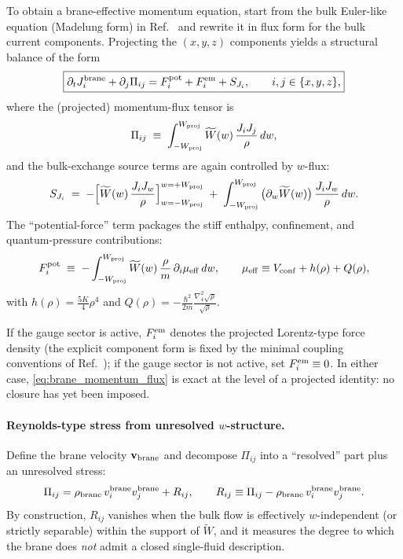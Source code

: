 \documentclass[11pt]{article}
\begin{document}
To obtain a brane-effective momentum equation, start from the bulk Euler-like
equation (Madelung form) in Ref.~\cite{norris2026_4d_model} and rewrite it in flux form for the bulk
current components.  Projecting the $(x,y,z)$ components yields a structural
balance of the form
\begin{align}
\boxed{
\partial_t J^{\rm brane}_i + \partial_j \Pi_{ij} = F^{\rm pot}_i + F^{\rm em}_i + S_{J_i},
\qquad i,j\in\{x,y,z\},
}
\label{eq:brane_momentum_flux}
\end{align}
where the (projected) momentum-flux tensor is
\begin{align}
\Pi_{ij}
\;\equiv\;
\int_{-W_{\rm proj}}^{W_{\rm proj}} \widetilde W(w)\,\frac{J_iJ_j}{\rho}\,dw,
\label{eq:Pi_def}
\end{align}
and the bulk-exchange source terms are again controlled by $w$-flux:
\begin{align}
S_{J_i}
\;=\;
-\Big[\widetilde W(w)\,\frac{J_iJ_w}{\rho}\Big]_{w=-W_{\rm proj}}^{w=+W_{\rm proj}}
\;+\;
\int_{-W_{\rm proj}}^{W_{\rm proj}} \big(\partial_w \widetilde W(w)\big)\,\frac{J_iJ_w}{\rho}\,dw.
\label{eq:brane_momentum_leak}
\end{align}
The ``potential-force'' term packages the stiff enthalpy, confinement, and
quantum-pressure contributions:
\begin{align}
F^{\rm pot}_i
\;\equiv\;
-\int_{-W_{\rm proj}}^{W_{\rm proj}}
\widetilde W(w)\,\frac{\rho}{m}\,\partial_i\mu_{\rm eff}\,dw,
\qquad
\mu_{\rm eff}\equiv V_{\rm conf}+h(\rho)+Q(\rho),
\label{eq:Fpot_def}
\end{align}
with $h(\rho)=\frac{5K}{4}\rho^4$ and $Q(\rho)=-\frac{\hbar^2}{2m}
\frac{\nabla_4^2\sqrt{\rho}}{\sqrt{\rho}}$.

If the gauge sector is active, $F^{\rm em}_i$ denotes the projected Lorentz-type
force density (the explicit component form is fixed by the minimal coupling
conventions of Ref.~\cite{norris2026_4d_model}); if the gauge sector is not active, set
$F^{\rm em}_i\equiv 0$.  In either case, \eqref{eq:brane_momentum_flux} is exact
at the level of a projected identity: no closure has yet been imposed.

\paragraph{Reynolds-type stress from unresolved \texorpdfstring{$w$}{w}-structure.}
Define the brane velocity $\mathbf{v}_{\rm brane}$ and decompose
$\Pi_{ij}$ into a ``resolved'' part plus an unresolved stress:
\begin{align}
\Pi_{ij} = \rho_{\rm brane}\,v^{\rm brane}_i v^{\rm brane}_j + R_{ij},
\qquad
R_{ij}\equiv \Pi_{ij}-\rho_{\rm brane}\,v^{\rm brane}_i v^{\rm brane}_j.
\label{eq:Rij_def}
\end{align}
By construction, $R_{ij}$ vanishes when the bulk flow is effectively
$w$-independent (or strictly separable) within the support of $\widetilde W$,
and it measures the degree to which the brane does \emph{not} admit a closed
single-fluid description.
\end{document}
